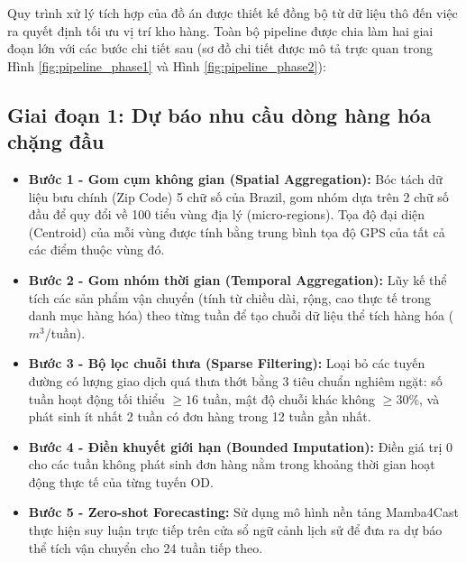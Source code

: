 Quy trình xử lý tích hợp của đồ án được thiết kế đồng bộ từ dữ liệu thô đến việc ra quyết định tối ưu vị trí kho hàng. Toàn bộ pipeline được chia làm hai giai đoạn lớn với các bước chi tiết sau (sơ đồ chi tiết được mô tả trực quan trong Hình \ref{fig:pipeline_phase1} và Hình \ref{fig:pipeline_phase2}):

\subsection{Giai đoạn 1: Dự báo nhu cầu dòng hàng hóa chặng đầu}
\begin{itemize}
    \item \textbf{Bước 1 - Gom cụm không gian (Spatial Aggregation):} Bóc tách dữ liệu bưu chính (Zip Code) 5 chữ số của Brazil, gom nhóm dựa trên 2 chữ số đầu để quy đổi về 100 tiểu vùng địa lý (micro-regions). Tọa độ đại diện (Centroid) của mỗi vùng được tính bằng trung bình tọa độ GPS của tất cả các điểm thuộc vùng đó.
    \item \textbf{Bước 2 - Gom nhóm thời gian (Temporal Aggregation):} Lũy kế thể tích các sản phẩm vận chuyển (tính từ chiều dài, rộng, cao thực tế trong danh mục hàng hóa) theo từng tuần để tạo chuỗi dữ liệu thể tích hàng hóa ($m^3$/tuần).
    \item \textbf{Bước 3 - Bộ lọc chuỗi thưa (Sparse Filtering):} Loại bỏ các tuyến đường có lượng giao dịch quá thưa thớt bằng 3 tiêu chuẩn nghiêm ngặt: số tuần hoạt động tối thiểu $\ge 16$ tuần, mật độ chuỗi khác không $\ge 30\%$, và phát sinh ít nhất 2 tuần có đơn hàng trong 12 tuần gần nhất.
    \item \textbf{Bước 4 - Điền khuyết giới hạn (Bounded Imputation):} Điền giá trị 0 cho các tuần không phát sinh đơn hàng nằm trong khoảng thời gian hoạt động thực tế của từng tuyến OD.
    \item \textbf{Bước 5 - Zero-shot Forecasting:} Sử dụng mô hình nền tảng Mamba4Cast thực hiện suy luận trực tiếp trên cửa sổ ngữ cảnh lịch sử để đưa ra dự báo thể tích vận chuyển cho 24 tuần tiếp theo.
\end{itemize}

